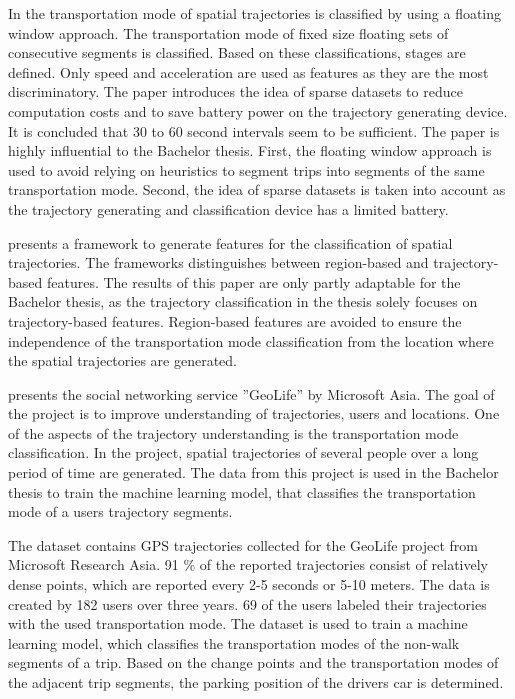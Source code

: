 In \cite{Bolbol2012} the transportation mode of spatial trajectories is classified by using a floating window approach. The transportation mode of fixed size floating sets of consecutive segments is classified. Based on these classifications, stages are defined. Only speed and acceleration are used as features as they are the most discriminatory. The paper introduces the idea of sparse datasets to reduce computation costs and to save battery power on the trajectory generating device. It is concluded that 30 to 60 second intervals seem to be sufficient.\newline
The paper is highly influential to the Bachelor thesis. First, the floating window approach is used to avoid relying on heuristics to segment trips into segments of the same transportation mode. Second, the idea of sparse datasets is taken into account as the trajectory generating and classification device has a limited battery. 

\cite{lee2008traclass} presents a framework to generate features for the classification of spatial trajectories. The frameworks distinguishes between region-based and trajectory-based features.  \newline
The results of this paper are only partly adaptable for the Bachelor thesis, as the trajectory classification in the thesis solely focuses on trajectory-based features. Region-based features are avoided to ensure the independence of the transportation mode classification from the location where the spatial trajectories are generated.

\cite{zheng2010geolife} presents the social networking service ''GeoLife'' by Microsoft Asia. The goal of the project is to improve understanding of trajectories, users and locations. One of the aspects of the trajectory understanding is the transportation mode classification. In the project, spatial trajectories of several people over a long period of time are generated.\newline
The data from this project is used in the Bachelor thesis to train the machine learning model, that classifies the transportation mode of a users trajectory segments.

The dataset \cite{zheng2010geolife} \cite{zheng2008understanding} \cite{geolife-dataset} \cite{zheng2009mining} contains GPS trajectories collected for the GeoLife project from Microsoft Research Asia. 91 \% of the reported trajectories consist of relatively dense points, which are reported every 2-5 seconds or 5-10 meters. The data is created by 182 users over three years. 69 of the users labeled their trajectories with the used transportation mode. \newline
The dataset is used to train a machine learning model, which classifies the transportation modes of the non-walk segments of a trip. Based on the change points and the transportation modes of the adjacent trip segments, the parking position of the drivers car is determined. 


